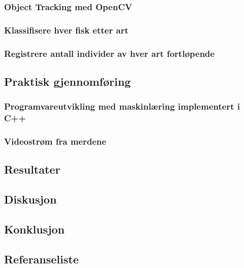 \subsubsection{Object Tracking med OpenCV}
\subsubsection{Klassifisere hver fisk etter art}
\subsubsection{Registrere antall individer av hver art fortløpende}
\subsection{Praktisk gjennomføring}
\subsubsection{Programvareutvikling med maskinlæring implementert i C++}
\subsubsection{Videostrøm fra merdene}
\subsection{Resultater}
\subsection{Diskusjon}
\subsection{Konklusjon}
\subsection{Referanseliste}
